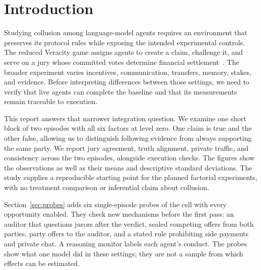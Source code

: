 \section{Introduction}
\label{sec:introduction}

Studying collusion among language-model agents requires an environment that
preserves its protocol rules while exposing the intended experimental controls.
The reduced Veracity game assigns agents to create a claim, challenge it, and
serve on a jury whose committed votes determine financial
settlement~\cite{project-spec}. The broader experiment varies incentives,
communication, transfers, memory, stakes, and evidence. Before interpreting
differences between those settings, we need to verify that live agents can
complete the baseline and that its measurements remain traceable to execution.

This report answers that narrower integration question. We examine one short
block of two episodes with all six factors at level zero. One claim is true
and the other false, allowing us to distinguish following evidence from always
supporting the same party. We report jury agreement, truth alignment, private
traffic, and consistency across the two episodes, alongside execution checks.
The figures show the observations as well as their means and descriptive
standard deviations. The study supplies a reproducible starting point for
the planned factorial experiments, with no treatment comparison or inferential
claim about collusion.

Section~\ref{sec:probes} adds six single-episode probes of the cell with every
opportunity enabled. They check new mechanisms before the first pass: an
auditor that questions jurors after the verdict, sealed competing offers from
both parties, party offers to the auditor, and a stated rule prohibiting side
payments and private chat. A reasoning monitor labels each agent's conduct. The
probes show what one model did in these settings; they are not a sample from
which effects can be estimated.

